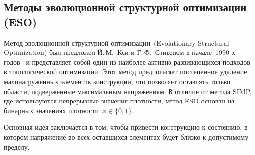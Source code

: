 
\subsection{Методы эволюционной структурной оптимизации (ESO)}

Метод эволюционной структурной оптимизации~(Evolutionary Structural Optimization) был предложен Й.\,М.~Кси и Г.\,Ф.~Стивеном в начале~1990-х годов~\cite{Xie1993,Xie1997} и представляет собой один из наиболее активно развивающихся подходов в топологической оптимизации. 
Этот метод предполагает постепенное удаление малонагруженных элементов конструкции, что позволяет оставлять только области, подверженные максимальным напряжениям. 
В отличие от метода SIMP, где используются непрерывные значения плотности, метод ESO основан на бинарных значениях плотности~$x\in\{0,1\}$.

Основная идея заключается в том, чтобы привести конструкцию к состоянию, в котором напряжение во всех оставшихся элементах будет близко к допустимому пределу.           


